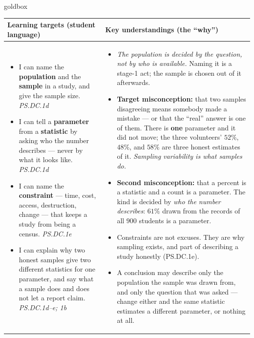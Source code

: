 \documentclass[10pt]{article}
\begin{document}
\renewcommand{\arraystretch}{1.4}
\boxguard
\begin{skillbox}{goldbox}
\begin{tabularx}{\linewidth}{@{}X|X@{}}
\textbf{Learning targets (student language)} & \textbf{Key understandings (the ``why'')} \\[2pt]
\hline
\vspace{-6pt}
\begin{itemize}[leftmargin=1.1em, nosep, after=\vspace{2pt}]
  \item I can name the \textbf{population} and the \textbf{sample} in a study, and give the
        sample size. \hfill \textit{PS.DC.1d}
  \item I can tell a \textbf{parameter} from a \textbf{statistic} by asking who the number
        describes --- never by what it looks like. \hfill \textit{PS.DC.1d}
  \item I can name the \textbf{constraint} --- time, cost, access, destruction, change --- that
        keeps a study from being a census. \hfill \textit{PS.DC.1e}
  \item I can explain why two honest samples give two different statistics for one parameter,
        and say what a sample does and does not let a report claim.
        \hfill \textit{PS.DC.1d--e; 1b}
\end{itemize}
&
\vspace{-6pt}
\begin{itemize}[leftmargin=1.1em, nosep, after=\vspace{2pt}]
  \item \emph{The population is decided by the question, not by who is available.} Naming it
        is a stage-1 act; the sample is chosen out of it afterwards.
  \item \textbf{Target misconception:} that two samples disagreeing means somebody made a
        mistake --- or that the ``real'' answer is one of them. There is \textbf{one}
        parameter and it did not move; the three volunteers' $52\%$, $48\%$, and $58\%$ are
        three honest estimates of it. \emph{Sampling variability is what samples do.}
  \item \textbf{Second misconception:} that a percent is a statistic and a count is a
        parameter. The kind is decided by \emph{who the number describes}: $61\%$ drawn from
        the records of all $900$ students is a parameter.
  \item Constraints are not excuses. They are why sampling exists, and part of describing a
        study honestly (PS.DC.1e).
  \item A conclusion may describe only the population the sample was drawn from, and only
        the question that was asked --- change either and the same statistic estimates a
        different parameter, or nothing at all.
\end{itemize}
\end{tabularx}
\end{skillbox}
\end{document}
